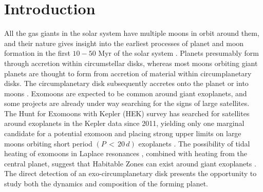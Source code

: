 \documentclass[twocolumn]{aa}
\begin{document}
\section{Introduction}

All the gas giants in the solar system have multiple moons in orbit around them, 
and their nature gives insight into the earliest processes of planet and moon formation in the first $10-50$ Myr of the solar system \citep[e.g. see reviews by ][]{Armitage11,Kley12}.
%
Planets presumably form through accretion within circumstellar disks, whereas most moons orbiting giant planets are thought to form from accretion of material within circumplanetary disks. 
%
The circumplanetary disk subsequently accretes onto the planet or into moons \citep{Canup02,Magni04,Ward10}.
%
Exomoons are expected to be common around giant exoplanets, and some projects are already under way searching for the signs of large satellites.
%
The Hunt for Exomoons with Kepler (HEK) survey has searched for satellites around exoplanets in the Kepler data since 2011\citep{Kipping12}, yielding only one marginal candidate for a potential exomoon\citep{Teachey18} and placing strong upper limits on large moons orbiting short period $(P\,<\,20\,d)$ exoplanets \citep{Kipping18}.
%
The possibility of tidal heating of exomoons in Laplace resonances \citep{Peters13}, combined with heating from the central planet, suggest that Habitable Zones can exist around giant exoplanets \citep{Heller14b}.
%
The direct detection of an exo-circumplanetary disk presents the opportunity to study both the dynamics and composition of the forming planet.
\end{document}

